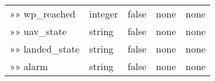 \documentclass[
]{article}
\begin{document}
\begin{longtable}[]{@{}lllll@{}}
\begin{minipage}[t]{0.17\columnwidth}
»» wp\_reached\strut
\end{minipage} & \begin{minipage}[t]{0.17\columnwidth}\raggedright
integer\strut
\end{minipage} & \begin{minipage}[t]{0.17\columnwidth}\raggedright
false\strut
\end{minipage} & \begin{minipage}[t]{0.17\columnwidth}\raggedright
none\strut
\end{minipage} & \begin{minipage}[t]{0.17\columnwidth}\raggedright
none\strut
\end{minipage}\tabularnewline
\begin{minipage}[t]{0.17\columnwidth}\raggedright
»» uav\_state\strut
\end{minipage} & \begin{minipage}[t]{0.17\columnwidth}\raggedright
string\strut
\end{minipage} & \begin{minipage}[t]{0.17\columnwidth}\raggedright
false\strut
\end{minipage} & \begin{minipage}[t]{0.17\columnwidth}\raggedright
none\strut
\end{minipage} & \begin{minipage}[t]{0.17\columnwidth}\raggedright
none\strut
\end{minipage}\tabularnewline
\begin{minipage}[t]{0.17\columnwidth}\raggedright
»» landed\_state\strut
\end{minipage} & \begin{minipage}[t]{0.17\columnwidth}\raggedright
string\strut
\end{minipage} & \begin{minipage}[t]{0.17\columnwidth}\raggedright
false\strut
\end{minipage} & \begin{minipage}[t]{0.17\columnwidth}\raggedright
none\strut
\end{minipage} & \begin{minipage}[t]{0.17\columnwidth}\raggedright
none\strut
\end{minipage}\tabularnewline
\begin{minipage}[t]{0.17\columnwidth}\raggedright
»» alarm\strut
\end{minipage} & \begin{minipage}[t]{0.17\columnwidth}\raggedright
string\strut
\end{minipage} & \begin{minipage}[t]{0.17\columnwidth}\raggedright
false\strut
\end{minipage} & \begin{minipage}[t]{0.17\columnwidth}\raggedright
none\strut
\end{minipage} & \begin{minipage}[t]{0.17\columnwidth}\raggedright
none\strut
\end{minipage}\tabularnewline
\bottomrule
\end{longtable}
\end{document}
